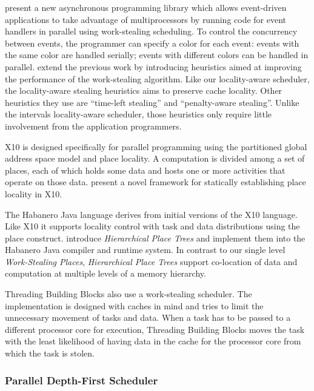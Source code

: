 \textcite{Zeldovich2003} present a new asynchronous programming
library which allows event-driven applications to take advantage of
multiprocessors by running code for event handlers in parallel using
work-stealing scheduling. To control the concurrency between events,
the programmer can specify a color for each event: events with the
same color are handled serially; events with different colors can be
handled in parallel. \textcite{Gaud2010} extend the previous work by
introducing heuristics aimed at improving the performance of the
work-stealing algorithm. Like our locality-aware scheduler, the
locality-aware stealing heuristics aims to preserve cache
locality. Other heuristics they use are ``time-left stealing'' and
``penalty-aware stealing''. Unlike the intervals locality-aware
scheduler, those heuristics only require little involvement from the
application programmers.

X10 \cite{Charles2005, Saraswat2010} is designed specifically for
parallel programming using the partitioned global address space model
and place locality. A computation is divided among a set of places,
each of which holds some data and hosts one or more activities that
operate on those data. \textcite{Agarwal2008} present a novel
framework for statically establishing place locality in X10.

The Habanero Java \cite{HJ} language derives from initial versions of
the X10 language. Like X10 it supports locality control with task and
data distributions using the place construct. \textcite{Yan2009}
introduce \emph{Hierarchical Place Trees} and implement them into the
Habanero Java compiler and runtime system. In contrast to our single
level \emph{Work-Stealing Places}, \emph{Hierarchical Place Trees}
support co-location of data and computation at multiple levels of a
memory hierarchy.

Threading Building Blocks \cite{Contreras2008, Reinders2007} also use
a work-stealing scheduler. The implementation is designed with caches
in mind and tries to limit the unnecessary movement of tasks and
data. When a task has to be passed to a different processor core for
execution, Threading Building Blocks moves the task with the least
likelihood of having data in the cache for the processor core from
which the task is stolen.

\subsubsection{Parallel Depth-First Scheduler}

